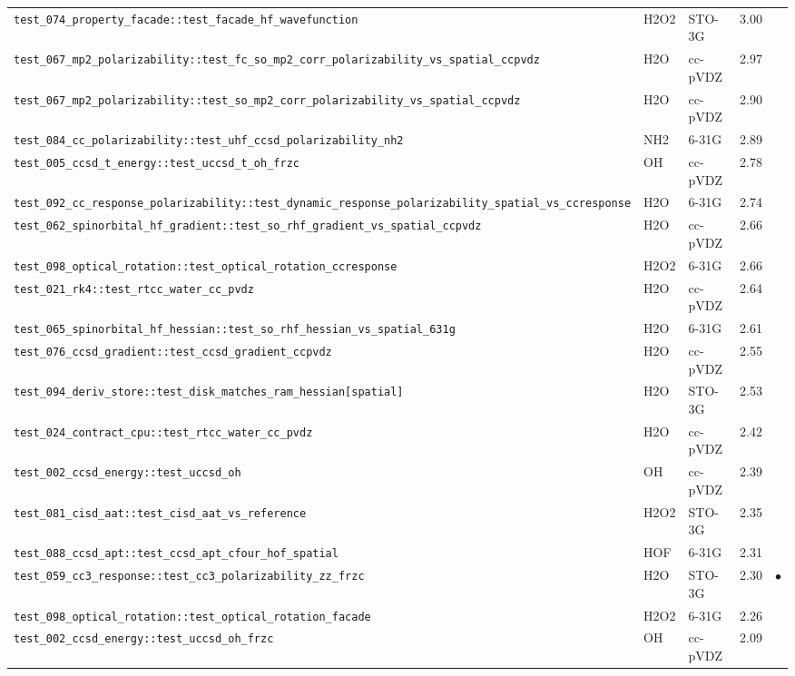 \documentclass[10pt]{article}
\begin{document}
\begin{longtable}{l l l r c}
\texttt{test\_074\_property\_facade::test\_facade\_hf\_wavefunction} & H2O2 & STO-3G & 3.00 &  \\
\texttt{test\_067\_mp2\_polarizability::test\_fc\_so\_mp2\_corr\_polarizability\_vs\_spatial\_ccpvdz} & H2O & cc-pVDZ & 2.97 &  \\
\texttt{test\_067\_mp2\_polarizability::test\_so\_mp2\_corr\_polarizability\_vs\_spatial\_ccpvdz} & H2O & cc-pVDZ & 2.90 &  \\
\texttt{test\_084\_cc\_polarizability::test\_uhf\_ccsd\_polarizability\_nh2} & NH2 & 6-31G & 2.89 &  \\
\texttt{test\_005\_ccsd\_t\_energy::test\_uccsd\_t\_oh\_frzc} & OH & cc-pVDZ & 2.78 &  \\
\texttt{test\_092\_cc\_response\_polarizability::test\_dynamic\_response\_polarizability\_spatial\_vs\_ccresponse} & H2O & 6-31G & 2.74 &  \\
\texttt{test\_062\_spinorbital\_hf\_gradient::test\_so\_rhf\_gradient\_vs\_spatial\_ccpvdz} & H2O & cc-pVDZ & 2.66 &  \\
\texttt{test\_098\_optical\_rotation::test\_optical\_rotation\_ccresponse} & H2O2 & 6-31G & 2.66 &  \\
\texttt{test\_021\_rk4::test\_rtcc\_water\_cc\_pvdz} & H2O & cc-pVDZ & 2.64 &  \\
\texttt{test\_065\_spinorbital\_hf\_hessian::test\_so\_rhf\_hessian\_vs\_spatial\_631g} & H2O & 6-31G & 2.61 &  \\
\texttt{test\_076\_ccsd\_gradient::test\_ccsd\_gradient\_ccpvdz} & H2O & cc-pVDZ & 2.55 &  \\
\texttt{test\_094\_deriv\_store::test\_disk\_matches\_ram\_hessian[spatial]} & H2O & STO-3G & 2.53 &  \\
\texttt{test\_024\_contract\_cpu::test\_rtcc\_water\_cc\_pvdz} & H2O & cc-pVDZ & 2.42 &  \\
\texttt{test\_002\_ccsd\_energy::test\_uccsd\_oh} & OH & cc-pVDZ & 2.39 &  \\
\texttt{test\_081\_cisd\_aat::test\_cisd\_aat\_vs\_reference} & H2O2 & STO-3G & 2.35 &  \\
\texttt{test\_088\_ccsd\_apt::test\_ccsd\_apt\_cfour\_hof\_spatial} & HOF & 6-31G & 2.31 &  \\
\texttt{test\_059\_cc3\_response::test\_cc3\_polarizability\_zz\_frzc} & H2O & STO-3G & 2.30 & $\bullet$ \\
\texttt{test\_098\_optical\_rotation::test\_optical\_rotation\_facade} & H2O2 & 6-31G & 2.26 &  \\
\texttt{test\_002\_ccsd\_energy::test\_uccsd\_oh\_frzc} & OH & cc-pVDZ & 2.09 &  \\

\end{longtable}
\end{document}
